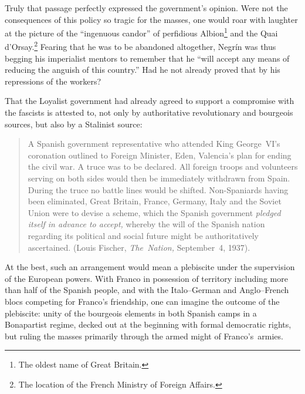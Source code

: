 Truly that passage perfectly expressed the government’s opinion. Were not the consequences of this policy so tragic for the masses, one would roar with laughter at the picture of the ``ingenuous candor'' of perfidious Albion\kn\footnote{The oldest name of Great Britain.} and the Quai d’Orsay.\kn\kn\footnote{The location of the French Ministry of Foreign Affairs.} Fearing that he was to be abandoned altogether\kn, Negr\'in was thus begging his imperialist mentors to remember that he ``will accept any means of reducing the anguish of this country.\kn\kn'' Had he not already proved that by his repressions of the workers?\kp\kp%

That the Loyalist government had already agreed to support a compromise with the fascists is attested to, not only by authoritative revolutionary and bourgeois sources, but also by a Stalinist source:

\indexLFischer
\begin{quotation}
  A Spanish government representative who attended King George~VI’s coronation outlined to Foreign Minister, Eden, Valencia’s plan for ending the civil war. A truce was to be declared. All foreign troops and volunteers serving on both sides would then be immediately withdrawn from Spain. During the truce no battle lines would be shifted. Non-Spaniards having been eliminated, Great Britain, France, Germany\kn, Italy and the Soviet Union were to devise a scheme, which the Spanish government \emph{pledged itself in advance to accept,} whereby the will of the Spanish nation regarding its political and social future might be authoritatively ascertained. (Louis Fischer\kn, \emph{The~Nation,} September~4, 1937).
\end{quotation}

At the best, such an arrangement would mean a plebiscite under the supervision of the European powers. With Franco in possession of territory including more than half of the Spanish people, and with the Italo--German and Anglo--French blocs competing for Franco’s friendship, one can imagine the outcome of the plebiscite: unity of the bourgeois elements in both Spanish camps in a Bonapartist regime, decked out at the beginning with formal democratic rights, but ruling the masses primarily through the armed might of Franco’s~armies.

